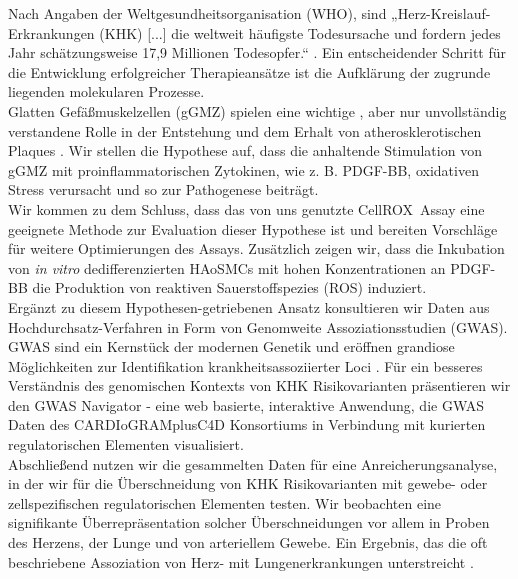 Nach Angaben der Weltgesundheitsorganisation (WHO), sind „Herz-Kreislauf-Erkrankungen (KHK) [...] die weltweit häufigste Todesursache und fordern jedes Jahr schätzungsweise 17,9 Millionen Todesopfer.“ \cite{whoCardiovascularDiseases2022}. Ein entscheidender Schritt für die Entwicklung erfolgreicher Therapieansätze ist die Aufklärung der zugrunde liegenden molekularen Prozesse.\\
Glatten Gefäßmuskelzellen (gGMZ) spielen eine wichtige \cite{doranRoleSmoothMuscle2008}, aber nur unvollständig verstandene Rolle in der Entstehung und dem Erhalt von atherosklerotischen Plaques \cite{liuSmoothMuscleCell2019, grootaertVascularSmoothMuscle2021, yapSixShadesVascular2021}. Wir stellen die Hypothese auf, dass die anhaltende Stimulation von gGMZ mit proinflammatorischen Zytokinen, wie z. B. PDGF-BB, oxidativen Stress verursacht und so zur Pathogenese beiträgt.\\
Wir kommen zu dem Schluss, dass das von uns genutzte CellROX\texttrademark~Assay eine geeignete Methode zur Evaluation dieser Hypothese ist und bereiten Vorschläge für weitere Optimierungen des Assays. Zusätzlich zeigen wir, dass die Inkubation von \textit{in vitro} dedifferenzierten HAoSMCs mit hohen Konzentrationen an PDGF-BB die Produktion von reaktiven Sauerstoffspezies (ROS) induziert.\\
Ergänzt zu diesem Hypothesen-getriebenen Ansatz konsultieren wir Daten aus Hochdurchsatz-Verfahren in Form von Genomweite Assoziationsstudien (GWAS). GWAS sind ein Kernstück der modernen Genetik und eröffnen grandiose Möglichkeiten zur Identifikation krankheitsassoziierter Loci \cite{uffelmannGenomewideAssociationStudies2021}. Für ein besseres Verständnis des genomischen Kontexts von KHK Risikovarianten präsentieren wir den GWAS Navigator - eine web basierte, interaktive Anwendung, die GWAS Daten des CARDIoGRAMplusC4D Konsortiums \cite{aragamDiscoverySystematicCharacterization2021} in Verbindung mit kurierten regulatorischen Elementen visualisiert. \\
Abschließend nutzen wir die gesammelten Daten für eine Anreicherungsanalyse, in der wir für die Überschneidung von KHK Risikovarianten mit gewebe- oder zellspezifischen regulatorischen Elementen testen. Wir beobachten eine signifikante Überrepräsentation solcher Überschneidungen vor allem in Proben des Herzens, der Lunge und von arteriellem Gewebe. Ein Ergebnis, das die oft beschriebene Assoziation von Herz- mit Lungenerkrankungen unterstreicht \cite{carterAssociationCardiovascularDisease2019, nowakLungFunctionCoronary2018, hanPulmonaryDiseasesHeart2007}.
